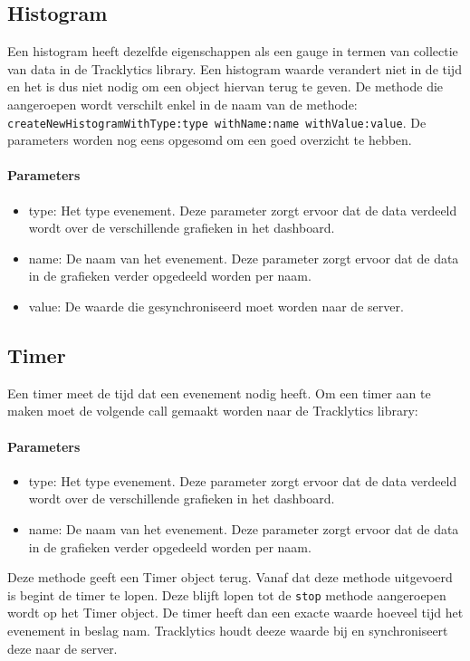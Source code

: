 \subsection{Histogram}
Een histogram heeft dezelfde eigenschappen als een gauge in termen van collectie van data in de Tracklytics library. Een histogram waarde verandert niet in de tijd en het is dus niet nodig om een object hiervan terug te geven. De methode die aangeroepen wordt verschilt enkel in de naam van de methode: \texttt{\justify  createNewHistogramWithType:type withName:name withValue:value}. De parameters worden nog eens opgesomd om een goed overzicht te hebben.

\paragraph{Parameters}
\begin{itemize}
\item type: Het type evenement. Deze parameter zorgt ervoor dat de data verdeeld wordt over de verschillende grafieken in het dashboard.
\item name: De naam van het evenement. Deze parameter zorgt ervoor dat de data in de grafieken verder opgedeeld worden per naam.
\item value: De waarde die gesynchroniseerd moet worden naar de server.
\end{itemize}

\subsection{Timer}
Een timer meet de tijd dat een evenement nodig heeft. Om een timer aan te maken moet de volgende call gemaakt worden naar de Tracklytics library: \texttt{} 

\paragraph{Parameters}
\begin{itemize}
\item type: Het type evenement. Deze parameter zorgt ervoor dat de data verdeeld wordt over de verschillende grafieken in het dashboard.
\item name: De naam van het evenement. Deze parameter zorgt ervoor dat de data in de grafieken verder opgedeeld worden per naam.
\end{itemize} 

Deze methode geeft een Timer object terug. Vanaf dat deze methode uitgevoerd is begint de timer te lopen. Deze blijft lopen tot de \texttt{\justify stop} methode aangeroepen wordt op het Timer object. De timer heeft dan een exacte waarde hoeveel tijd het evenement in beslag nam. Tracklytics houdt deeze waarde bij en synchroniseert deze naar de server. 


